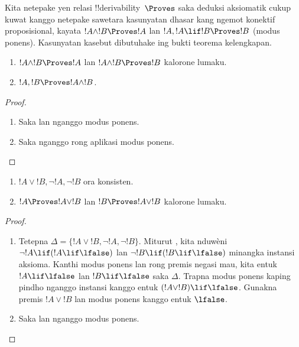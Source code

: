 \documentclass[../../../include/open-logic-section]{subfiles}
\begin{document}
      {}
      {}


\begin{explain}
  Kita netepake yen relasi !!{derivability}~$\Proves$ saka deduksi
  aksiomatik cukup kuwat kanggo netepake sawetara kasunyatan dhasar
  kang ngemot konektif proposisional, kayata $!A \land !B \Proves !A$
  lan $!A, !A \lif !B \Proves !B$ (modus ponens). Kasunyatan kasebut
  dibutuhake ing bukti teorema kelengkapan.
\end{explain}

\begin{prop}
  \begin{enumerate}
  \item {} $!A \land !B \Proves !A$
    lan $!A \land !B \Proves !B$ kalorone lumaku.
  \item {} $!A, !B \Proves !A \land !B$.
  \end{enumerate}
\end{prop}

\begin{proof}
  \begin{enumerate}
    \item Saka  lan 
      nganggo modus ponens.
  \item Saka  nganggo rong aplikasi modus ponens.
  \end{enumerate}
\end{proof}


\begin{prop}
  \begin{enumerate}
  \item $!A \lor !B, \lnot !A, \lnot !B$ ora konsisten.
  \item $!A \Proves !A \lor !B$ lan $!B \Proves !A \lor !B$
    kalorone lumaku.
  \end{enumerate}
\end{prop}

\begin{proof}
  \begin{enumerate}
  \item Tetepna $\Delta=\{!A\lor !B,\lnot !A,\lnot !B\}$.
    Miturut , kita nduwèni $\lnot !A\lif(!A\lif\lfalse)$
    lan $\lnot !B\lif(!B\lif\lfalse)$ minangka instansi aksioma.
    Kanthi modus ponens lan rong premis negasi mau, kita entuk
    $!A\lif\lfalse$ lan $!B\lif\lfalse$ saka $\Delta$.
    Trapna modus ponens kaping pindho nganggo instansi  kanggo entuk
    $(!A\lor !B)\lif\lfalse$. Gunakna premis $!A\lor !B$
    lan modus ponens kanggo entuk $\lfalse$.
  \item Saka  lan  nganggo
    modus ponens.
  \end{enumerate}
\end{proof}
\end{document}
